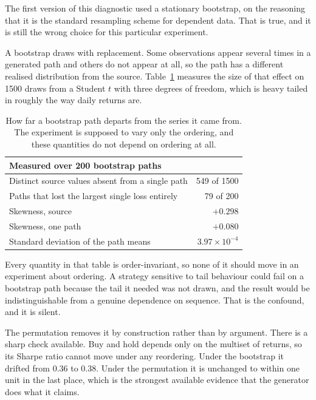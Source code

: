 \documentclass[11pt]{article}
\begin{document}
The first version of this diagnostic used a stationary bootstrap, on the
reasoning that it is the standard resampling scheme for dependent data. That is
true, and it is still the wrong choice for this particular experiment.

A bootstrap draws with replacement. Some observations appear several times in a
generated path and others do not appear at all, so the path has a different
realised distribution from the source. Table~\ref{tab:bootstrap} measures the
size of that effect on 1500 draws from a Student $t$ with three degrees of
freedom, which is heavy tailed in roughly the way daily returns are.

\begin{table}[h]
  \centering
  \small
  \begin{tabular}{lr}
    \toprule
    Measured over 200 bootstrap paths & \\
    \midrule
    Distinct source values absent from a single path & 549 of 1500 \\
    Paths that lost the largest single loss entirely & 79 of 200 \\
    Skewness, source & $+0.298$ \\
    Skewness, one path & $+0.080$ \\
    Standard deviation of the path means & $3.97\times10^{-4}$ \\
    \bottomrule
  \end{tabular}
  \caption{How far a bootstrap path departs from the series it came from. The
  experiment is supposed to vary only the ordering, and these quantities do not
  depend on ordering at all.}
  \label{tab:bootstrap}
\end{table}

Every quantity in that table is order-invariant, so none of it should move in an
experiment about ordering. A strategy sensitive to tail behaviour could fail on
a bootstrap path because the tail it needed was not drawn, and the result would
be indistinguishable from a genuine dependence on sequence. That is the
confound, and it is silent.

The permutation removes it by construction rather than by argument. There is a
sharp check available. Buy and hold depends only on the multiset of returns, so
its Sharpe ratio cannot move under any reordering. Under the bootstrap it drifted
from $0.36$ to $0.38$. Under the permutation it is unchanged to within one unit
in the last place, which is the strongest available evidence that the generator
does what it claims.
\end{document}
